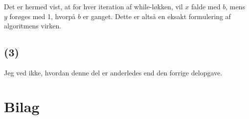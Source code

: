 \documentclass[a4paper,10pt]{article}
\begin{document}
Det er hermed vist, at for hver iteration af while-løkken, vil $x$ falde med $b$, mens $y$ forøges med 1, hvorpå $b$ er ganget. Dette er altså en eksakt formulering af algoritmens virken. 

\subsection*{(3)}

Jeg ved ikke, hvordan denne del er anderledes end den forrige delopgave. 

\newpage

\section*{Bilag}

\end{document}
